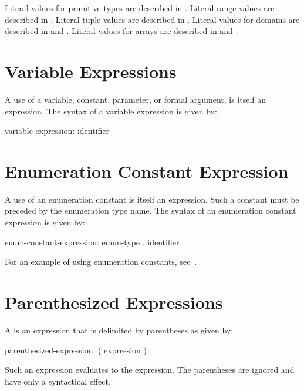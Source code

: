 Literal values for primitive types are described in
.
Literal range values are described in .
Literal tuple values are described in .
Literal values for domains are described in 
and .
Literal values for arrays are described in  
and .


\section{Variable Expressions}
\label{Variable_Expressions}

A use of a variable, constant, parameter, or formal argument, is
itself an expression.  The syntax of a variable expression is given
by:
\begin{syntax}
variable-expression:
  identifier
\end{syntax}

\section{Enumeration Constant Expression}
\label{Enumeration_Constant_Expression}

A use of an enumeration constant is itself an expression.  Such a
constant must be preceded by the enumeration type name.  The syntax of
an enumeration constant expression is given by:
\begin{syntax}
enum-constant-expression:
  enum-type . identifier
\end{syntax}

For an example of using enumeration constants,
see~.

\section{Parenthesized Expressions}
\label{Parenthesized_Expressions}

A  is an expression that is delimited
by parentheses as given by:
\begin{syntax}
parenthesized-expression:
  ( expression )
\end{syntax}
Such an expression evaluates to the expression.  The parentheses are
ignored and have only a syntactical effect.

